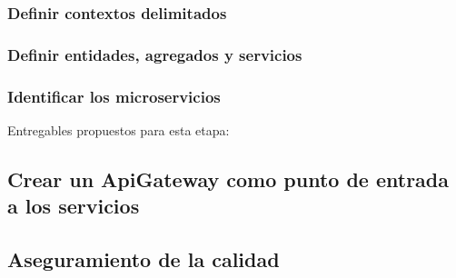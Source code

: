 \subsubsection{Definir contextos delimitados}


\subsubsection{Definir entidades, agregados y servicios}


\subsubsection{Identificar los microservicios}



Entregables propuestos para esta etapa:

\subsection{Crear un ApiGateway como punto de entrada a los servicios}

\subsection{Aseguramiento de la calidad}
